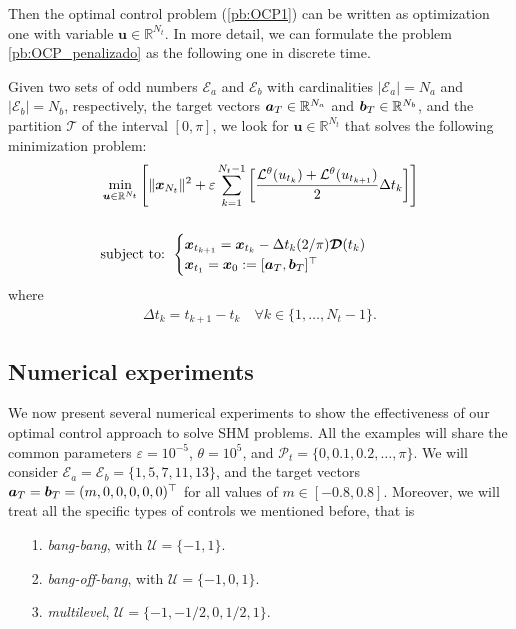 \documentclass[9pt,shortpaper,twoside,web]{ieeecolor}
\begin{document}
Then the optimal control problem (\ref{pb:OCP1}) can be written as optimization one with variable $\bm{u} \in \mathbb{R}^{N_t}$. In more detail, we can formulate the problem \ref{pb:OCP_penalizado} as the following one in discrete time.

\begin{problem}\label{pb:numOCP2}
	Given two sets of odd numbers $\mathcal{E}_a$ and $\mathcal{E}_b$ with cardinalities $|\mathcal{E}_a| = N_a$ and $|\mathcal{E}_b| = N_b$, respectively, the target vectors $\bm{a}_T \in \mathbb{R}^{N_a}$ and $\bm{b}_T \in \mathbb{R}^{N_b}$, and the partition $\mathcal{T}$ of the interval $[0,\pi]$, we look for $\bm{u} \in \mathbb{R}^{N_t}$ that solves the following minimization problem:
	\begin{align*}
		&\min_{\bm{u} \in \mathbb{R}^{N_t}} \Bigg[\| \bm{x}_{N_t}\|^2 + \varepsilon \sum_{k=1}^{N_t-1} 
		\bigg[\frac{\mathcal{L}^\theta(u_{t_k}) + \mathcal{L}^\theta(u_{t_{k+1}})}{2}\Delta t_k \bigg]  \Bigg]  
		\\[15pt]
		&\notag \text{subject to: } \begin{cases}
			\bm{x}_{t_{k+1}} = \bm{x}_{t_k} - \Delta t_{k} (2/\pi) \bm{\mathcal{D}}(t_k)\\
			\bm{x}_{t_1} = \bm{x}_0:= [\bm{a}_T,\bm{b}_T]^\top
		\end{cases} 
	\end{align*}
	where 
	\begin{gather}
		\Delta t_{k} = t_{k+1} - t_{k} \hspace{1em} \forall k \in \{1,\dots,N_t-1\}.
	\end{gather}
\end{problem}

\subsection{Numerical experiments}

We now present several numerical experiments to show the effectiveness of our optimal control approach to solve SHM problems. All the examples will share the common parameters $\varepsilon = 10^{-5}$, $\theta = 10^5$, and $\mathcal{P}_t = \{0,0.1,0.2,\dots,\pi\}$. We will consider $\mathcal{E}_a = \mathcal{E}_b = \{1,5,7,11,13\}$, and the target vectors $\bm{a}_T = \bm{b}_T = (m,0,0,0,0,0)^\top$ for all values of $m \in [-0.8,0.8]$. Moreover, we will treat all the specific types of controls we mentioned before, that is
\begin{itemize}
	\item[1.] \emph{bang-bang}, with $\mathcal{U} = \{-1,1\}$.
	\vspace{0.05cm}
	\item[2.] \emph{bang-off-bang}, with $\mathcal{U} = \{-1,0,1\}$. 
	\vspace{0.05cm}
	\item[3.] \textit{multilevel}, $\mathcal{U} = \{-1,-1/2,0,1/2,1\}$.
\end{itemize}
\end{document}
